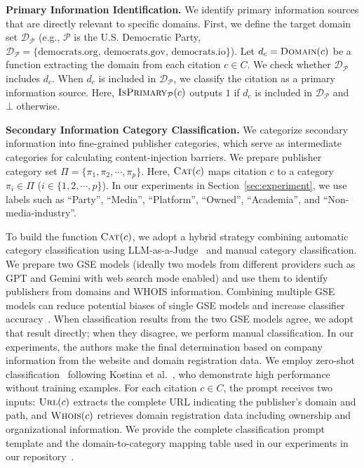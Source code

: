\textbf{Primary Information Identification.}
We identify primary information sources that are directly relevant to specific domains.
First, we define the target domain set $\mathcal{D}_{\mathcal{P}}$ (e.g., $\mathcal{P}$ is the U.S. Democratic Party, $\mathcal{D}_{\mathcal{P}} = \{\text{democrats.org, democrats.gov, democrats.io}\}$).
Let $d_c = \textsc{Domain}(c)$ be a function extracting the domain from each citation $c \in C$.
We check whether $\mathcal{D}_{\mathcal{P}}$ includes $d_c$.
When $d_c$ is included in $\mathcal{D}_{\mathcal{P}}$, we classify the citation as a primary information source.
Here, $\textsc{IsPrimary}_{\mathcal{P}}(c)$ outputs $1$ if $d_c$ is included in $\mathcal{D}_{\mathcal{P}}$ and $\bot$ otherwise.

\textbf{Secondary Information Category Classification.}
We categorize secondary information into fine-grained publisher categories, which serve as intermediate categories for calculating content-injection barriers.
We prepare publisher category set $\Pi = \{\pi_1, \pi_2, \cdots, \pi_p\}$.
Here, $\textsc{Cat}(c)$ maps citation $c$ to a category $\pi_i \in \Pi$ ($i \in \{1, 2, \cdots, p\}$).
In our experiments in Section~\ref{sec:experiment}, we use labels such as ``Party'', ``Media'', ``Platform'', ``Owned'', ``Academia'', and ``Non-media-industry''.

To build the function $\textsc{Cat}(c)$, we adopt a hybrid strategy combining automatic category classification using LLM-as-a-Judge~\cite{survey-llm-as-a-judge-arxiv24,judging-llm-as-a-judge-with-mt-bench-and-chatbot-arena-arxiv23} and manual category classification.
We prepare two GSE models (ideally two models from different providers such as GPT and Gemini with web search mode enabled) and use them to identify publishers from domains and WHOIS information.
Combining multiple GSE models can reduce potential biases of single GSE models and increase classifier accuracy~\cite{judging-llm-as-a-judge-with-mt-bench-and-chatbot-arena-arxiv23}.
When classification results from the two GSE models agree, we adopt that result directly; when they disagree, we perform manual classification.
In our experiments, the authors make the final determination based on company information from the website and domain registration data.
We employ zero-shot classification~\cite{radford2019language} following Kostina et al.~\cite{kostina2025largelanguagemodelstext}, who demonstrate high performance without training examples.
For each citation $c \in C$, the prompt receives two inputs: $\textsc{Url}(c)$ extracts the complete URL indicating the publisher's domain and path, and $\textsc{Whois}(c)$ retrieves domain registration data including ownership and organizational information.
We provide the complete classification prompt template and the domain-to-category mapping table used in our experiments in our repository~\cite{QL_CIKM_RERO}.

